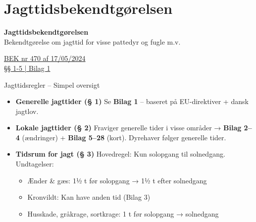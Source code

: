 \section{Jagttidsbekendtgørelsen}

\begin{frame}
  \vspace{3em}
  \begin{center}
    {\LARGE \textbf{Jagttidsbekendtgørelsen}}
    \vspace{2em}
    \\ Bekendtgørelse om jagttid for visse pattedyr og fugle m.v.
\par

{\normalsize \href{https://www.retsinformation.dk/eli/lta/2024/470}{BEK nr 470 af 17/05/2024 \\
§§ 1-5 | Bilag 1}}
\vspace{1em}
\par
  \end{center}
\end{frame}

\begin{frame}{Jagttidsregler – Simpel oversigt}
  \begin{itemize}
    \item \textbf{Generelle jagttider (§ 1)}  
      Se \textbf{Bilag 1} – baseret på EU-direktiver + dansk jagtlov.

    \item \textbf{Lokale jagttider (§ 2)}  
      Fraviger generelle tider i visse områder → \textbf{Bilag 2–4} (ændringer) + \textbf{Bilag 5–28} (kort).  
      Dyrehaver følger generelle tider.

    \item \textbf{Tidsrum for jagt (§ 3)}  
      Hovedregel: Kun \alert{solopgang til solnedgang}.  
      \small Undtagelser:
      \begin{itemize}
        \item Ænder \& gæs: 1½ t før solopgang → 1½ t efter solnedgang
        \item Kronvildt: Kan have anden tid (Bilag 3)
        \item Husskade, gråkrage, sortkrage: 1 t før solopgang → solnedgang
      \end{itemize}
  \end{itemize}
\end{frame}

